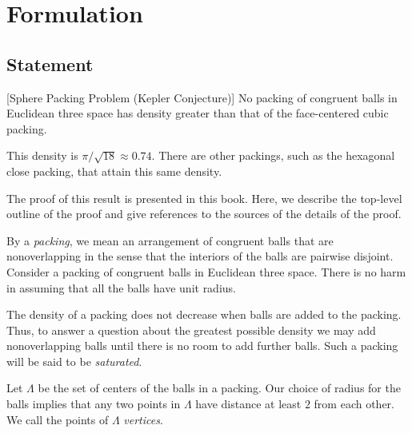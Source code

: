 



\chapter{Formulation}

\section{Statement}



\begin{theorem}[Sphere Packing Problem (Kepler Conjecture)]
\label{theorem:kepler}   No packing of congruent balls in
Euclidean three space has density greater than that of the
face-centered cubic packing.
\end{theorem}

\begin{remark}
This density is $\pi/\sqrt{18}\approx 0.74.$  There are other
packings, such as the hexagonal close packing, that attain this
same density.
\end{remark}

The proof of this result is presented in this book. Here, we
describe the top-level outline of the proof and give references to
the sources of the details of the proof.

By a {\it packing}, we mean an arrangement of congruent balls that
are nonoverlapping in the sense that the interiors of the balls are
pairwise disjoint. Consider a  packing of congruent
balls in Euclidean three space. There is no harm in assuming that
all the balls have unit radius. 

The density of a packing does not
decrease when balls are added to the packing. Thus, to answer a
question about the greatest possible density we may add
nonoverlapping balls until there is no room to add further balls.
Such a packing will be said to be {\it saturated}.


Let $\Lambda$ be the set of centers of the balls in a
packing. Our choice of radius for the
balls implies that any two points in $\Lambda$ have distance at
least $2$ from each other. We call the points of $\Lambda$ {\it
{} vertices}.


